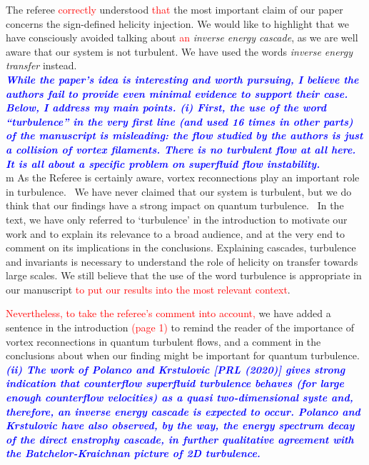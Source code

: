 \documentclass[a4paper,10pt]{article}
\def\red#1{\textcolor{red}{#1}}
\def\blue#1{\textcolor{blue}{#1}}
\def\refcomment#1{\textbf{\blue{\emph{#1}}}\\}
\begin{document}
The referee \red{correctly} understood \red{that}
the most important claim of our paper concerns the sign-defined helicity 
injection. We would like to highlight that we have consciously avoided 
talking about \red{an} {\it inverse energy cascade}, as we are well aware 
that our system is not turbulent. We have used the words {\it inverse energy transfer} instead.\\

\refcomment{While the paper’s idea is interesting and worth pursuing, I believe the authors fail to provide even minimal evidence to support their case. Below, I address my main points.
(i) First, the use of the word “turbulence” in the very first line (and used 16 times in other parts) of the manuscript is misleading: the flow studied by the authors is just a collision of vortex filaments. There is no turbulent flow at all here. It is all about a specific problem on superfluid flow instability.}

m
As the Referee is certainly aware, vortex reconnections play an important role in turbulence.  We have never claimed that our system is turbulent, but we do think that our findings have a strong impact on quantum turbulence.  In the text, we have only referred to `turbulence' in the introduction to motivate our work and to explain its relevance to a broad audience, and at the very end to comment on its implications in the conclusions. Explaining cascades, turbulence and invariants is necessary to understand the role of helicity on transfer towards large scales. We still believe that the use of the word turbulence is 
appropriate in our manuscript \red{to put our results into the most 
relevant context}. 

\red{Nevertheless, to take the referee's comment into account,}
we have added a sentence in the introduction \red{(page 1)}
to remind the reader of the importance of vortex reconnections 
in quantum turbulent flows, and a comment in the conclusions 
about when our finding might be important for quantum turbulence. \\

\refcomment{(ii) The work of Polanco and Krstulovic [PRL (2020)] gives strong indication that counterflow superfluid turbulence behaves (for large enough counterflow velocities) as a quasi two-dimensional syste and, therefore, an inverse energy cascade is expected to occur. Polanco and Krstulovic have also observed, by the way, the energy spectrum decay of the direct enstrophy cascade, in further qualitative agreement with the Batchelor-Kraichnan picture of 2D turbulence.}
\end{document}
